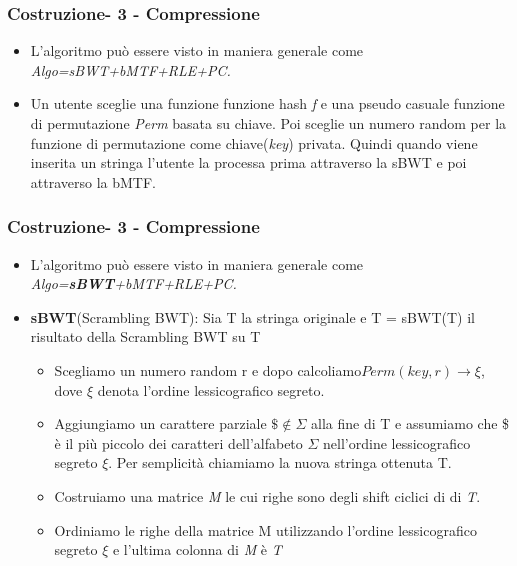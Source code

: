 \documentclass{beamer}
\begin{document}
\begin{frame}
\frametitle{Costruzione- 3 - Compressione}
\begin{itemize}
	\item L’algoritmo può essere visto in maniera generale come \textit{Algo=sBWT+bMTF+RLE+PC.}\pause
	\item Un utente sceglie una funzione funzione hash \textit{f} e una pseudo casuale funzione di permutazione \textit{Perm} basata su chiave. Poi sceglie un numero random per la funzione di permutazione come chiave(\textit{key}) privata. Quindi quando viene inserita un stringa l’utente la processa prima attraverso la sBWT e poi attraverso la bMTF. 
\end{itemize}
\end{frame}

\begin{frame}
\frametitle{Costruzione- 3 - Compressione}
\begin{itemize}
	\item L’algoritmo può essere visto in maniera generale come \textit{Algo=\textbf{sBWT}+bMTF+RLE+PC.}\pause
	\item \textbf{sBWT}(Scrambling BWT): Sia T la stringa originale e T = sBWT(T) il risultato della Scrambling BWT su T\pause
		\begin{itemize}
			\item Scegliamo un numero random r e dopo calcoliamo$  Perm(key,r) \rightarrow \xi $, dove $ \xi $ denota l’ordine lessicografico segreto.\pause
			\item Aggiungiamo un carattere parziale $\$ \notin \Sigma$ alla fine di T e assumiamo che \$ è il più piccolo dei caratteri dell'alfabeto $\Sigma$ nell’ordine lessicografico segreto $\xi$. Per semplicità chiamiamo la nuova stringa ottenuta T.\pause
			\item Costruiamo una matrice  \textit{M} le cui righe sono degli shift ciclici di di \textit{T}.\pause
			\item Ordiniamo le righe della matrice M utilizzando l’ordine lessicografico segreto $\xi$  e l’ultima colonna di \textit{M} è \textit{T}
		\end{itemize}
\end{itemize}
\end{frame}
\end{document}
